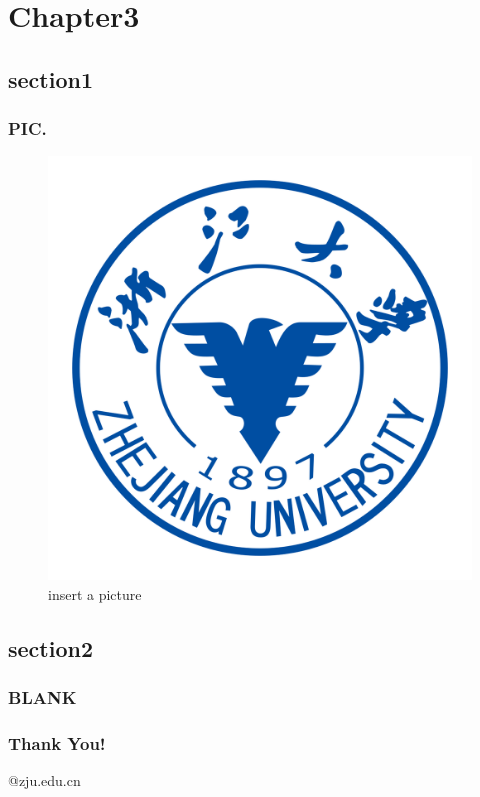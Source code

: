 \documentclass[xcolor=svgnames]{beamer}
\begin{document}
\section{Chapter3}
\subsection{section1}
\begin{frame}[fragile]
  \frametitle{PIC.}
  \begin{figure}
 \centering
 \includegraphics[width=0.5\linewidth]{ZJU_LOGO.png}
 \caption{insert a picture}
\end{figure}
\end{frame}


\subsection{section2}
\begin{frame}[fragile]
  \frametitle{BLANK}
\end{frame}


\begin{frame}
  \frametitle{Thank You!}

  \begin{center}
    \*\*\*@zju.edu.cn
  \end{center}
  \nocite{*}
  
\end{frame}

\end{document}

